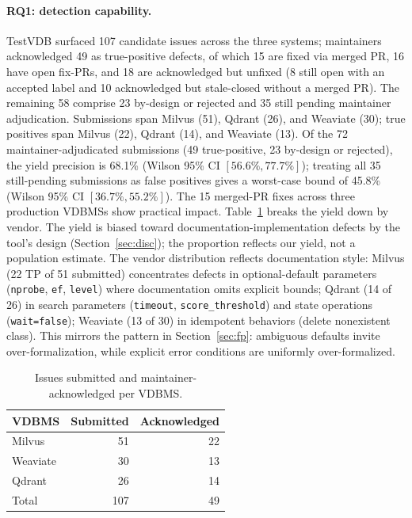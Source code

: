 \documentclass[sigconf]{acmart}
\begin{document}
\paragraph{RQ1: detection capability.}
TestVDB surfaced 107 candidate issues across the three systems; maintainers acknowledged 49 as true-positive defects, of which 15 are fixed via merged PR, 16 have open fix-PRs, and 18 are acknowledged but unfixed (8 still open with an accepted label and 10 acknowledged but stale-closed without a merged PR). The remaining 58 comprise 23 by-design or rejected and 35 still pending maintainer adjudication. Submissions span Milvus (51), Qdrant (26), and Weaviate (30); true positives span Milvus (22), Qdrant (14), and Weaviate (13). Of the 72 maintainer-adjudicated submissions (49 true-positive, 23 by-design or rejected), the yield precision is 68.1\% (Wilson 95\% CI $[56.6\%, 77.7\%]$); treating all 35 still-pending submissions as false positives gives a worst-case bound of 45.8\% (Wilson 95\% CI $[36.7\%, 55.2\%]$). The 15 merged-PR fixes across three production VDBMSs show practical impact. Table~\ref{tab:yield} breaks the yield down by vendor. The yield is biased toward documentation-implementation defects by the tool's design (Section~\ref{sec:disc}); the proportion reflects our yield, not a population estimate. The vendor distribution reflects documentation style: Milvus (22 TP of 51 submitted) concentrates defects in optional-default parameters (\texttt{nprobe}, \texttt{ef}, \texttt{level}) where documentation omits explicit bounds; Qdrant (14 of 26) in search parameters (\texttt{timeout}, \texttt{score\_threshold}) and state operations (\texttt{wait=false}); Weaviate (13 of 30) in idempotent behaviors (delete nonexistent class). This mirrors the pattern in Section~\ref{sec:fp}: ambiguous defaults invite over-formalization, while explicit error conditions are uniformly over-formalized.

\begin{table}[t]
\caption{Issues submitted and maintainer-acknowledged per VDBMS.}
\label{tab:yield}
\small
\begin{tabular}{@{}lrr@{}}
\toprule
VDBMS & Submitted & Acknowledged \\
\midrule
Milvus & 51 & 22 \\
Weaviate & 30 & 13 \\
Qdrant & 26 & 14 \\
\midrule
Total & 107 & 49 \\
\bottomrule
\end{tabular}
\end{table}
\end{document}
